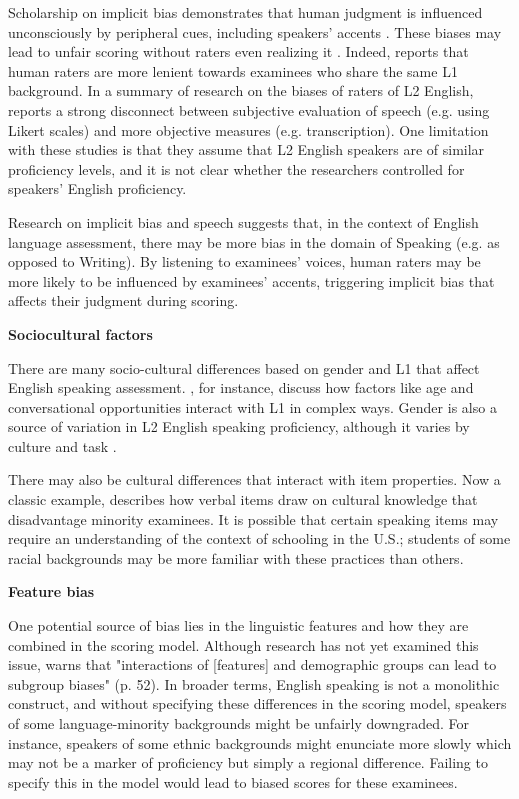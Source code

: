 \documentclass [PhD] {uclathes}
\begin{document}
Scholarship on implicit bias demonstrates that human judgment is influenced unconsciously by peripheral cues, including speakers’ accents \citep{kang2021social}. These biases may lead to unfair scoring without raters even realizing it \citep{greenwald1995}. Indeed, \citet{winke2013} reports that human raters are more lenient towards examinees who share the same L1 background. In a summary of research on the biases of raters of L2 English, \citet{lindemann2013reliably} reports a strong disconnect between subjective evaluation of speech (e.g. using Likert scales) and more objective measures (e.g. transcription). One limitation with these studies is that they assume that L2 English speakers are of similar proficiency levels, and it is not clear whether the researchers controlled for speakers’ English proficiency. 

Research on implicit bias and speech suggests that, in the context of English language assessment, there may be more bias in the domain of Speaking (e.g. as opposed to Writing). By listening to examinees’ voices, human raters may be more likely to be influenced by examinees’ accents, triggering implicit bias that affects their judgment during scoring.

\noindent \textbf{Sociocultural factors} \;

There are many socio-cultural differences based on gender and L1 that affect English speaking assessment. \citet{derwing2013development}, for instance, discuss how factors like age and conversational opportunities interact with L1 in complex ways. Gender is also a source of variation in L2 English speaking proficiency, although it varies by culture and task \citep{denies2022mapping}. 

There may also be cultural differences that interact with item properties. Now a classic example, \citet{freedle2003correcting} describes how verbal items draw on cultural knowledge that disadvantage minority examinees. It is possible that certain speaking items may require an understanding of the context of schooling in the U.S.; students of some racial backgrounds may be more familiar with these practices than others. 

\noindent \textbf{Feature bias} \;

One potential source of bias lies in the linguistic features and how they are combined in the scoring model. Although research has not yet examined this issue, \citet{zhang2019assessing} warns that "interactions of [features] and demographic groups can lead to subgroup biases" (p. 52). In broader terms, English speaking is not a monolithic construct, and without specifying these differences in the scoring model, speakers of some language-minority backgrounds might be unfairly downgraded. For instance, speakers of some ethnic backgrounds might enunciate more slowly which may not be a marker of proficiency but simply a regional difference. Failing to specify this in the model would lead to biased scores for these examinees.
\end{document}
